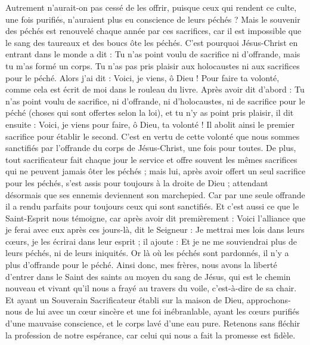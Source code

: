 \begin{multicols}{2}
Autrement n’aurait-on pas cessé de les offrir, puisque ceux qui rendent ce culte, une fois purifiés, n’auraient plus eu conscience de leurs péchés ?
Mais le souvenir des péchés est renouvelé chaque année par ces sacrifices,
car il est impossible que le sang des taureaux et des boucs ôte les péchés.
C'est pourquoi Jésus-Christ en entrant dans le monde a dit : Tu n'as point voulu de sacrifice ni d'offrande, mais tu m'as formé un corps.
Tu n'as pas pris plaisir aux holocaustes ni aux sacrifices pour le péché.
Alors j'ai dit : Voici, je viens, ô Dieu ! Pour faire ta volonté, comme cela est écrit de moi dans le rouleau du livre.
Après avoir dit d’abord : Tu n'as point voulu de sacrifice, ni d'offrande, ni d'holocaustes, ni de sacrifice pour le péché (choses qui sont offertes selon la loi), et tu n'y as point pris plaisir, il dit ensuite : Voici, je viens pour faire, ô Dieu, ta volonté !
Il abolit ainsi le premier sacrifice pour établir le second.
C’est en vertu de cette volonté que nous sommes sanctifiés par l’offrande du corps de Jésus-Christ, une fois pour toutes.
De plus, tout sacrificateur fait chaque jour le service et offre souvent les mêmes sacrifices qui ne peuvent jamais ôter les péchés ;
mais lui, après avoir offert un seul sacrifice pour les péchés, s’est assis pour toujours à la droite de Dieu ;
attendant désormais que ses ennemis deviennent son marchepied.
Car par une seule offrande il a rendu parfaits pour toujours ceux qui sont sanctifiés.
Et c'est aussi ce que le Saint-Esprit nous témoigne, car après avoir dit premièrement :
Voici l'alliance que je ferai avec eux après ces jours-là, dit le Seigneur : Je mettrai mes lois dans leurs cœurs, je les écrirai dans leur esprit ; il ajoute :
Et je ne me souviendrai plus de leurs péchés, ni de leurs iniquités.
Or là où les péchés sont pardonnés, il n'y a plus d’offrande pour le péché.
Ainsi donc, mes frères, nous avons la liberté d'entrer dans le Saint des saints au moyen du sang de Jésus,
qui est le chemin nouveau et vivant qu'il nous a frayé au travers du voile, c’est-à-dire de sa chair.
Et ayant un Souverain Sacrificateur établi sur la maison de Dieu,
approchons-nous de lui avec un cœur sincère et une foi inébranlable, ayant les cœurs purifiés d’une mauvaise conscience, et le corps lavé d’une eau pure.
Retenons sans fléchir la profession de notre espérance, car celui qui nous a fait la promesse est fidèle.

\end{multicols}
